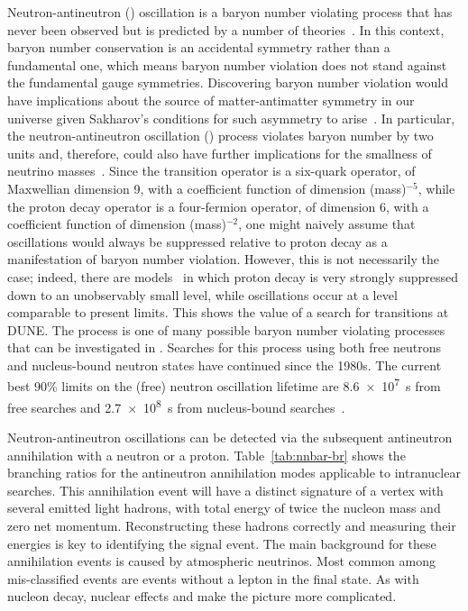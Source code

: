 Neutron-antineutron (\nnbar) oscillation is a baryon number violating process that
has never been observed but is predicted by a number of  theories~\cite{Phillips:2014fgb}. In this context, baryon number conservation is an accidental
symmetry rather than a fundamental one, which means baryon number violation
does not stand against the fundamental gauge symmetries. Discovering baryon
number violation would have implications about the source of matter-antimatter
symmetry in our universe given Sakharov's conditions for such asymmetry to arise~\cite{Sakharov:1967dj}.
In particular, the neutron-antineutron oscillation (\nnbar) process violates
baryon number by two units and, therefore, could also have further implications for
the smallness of neutrino masses~\cite{Phillips:2014fgb}. 
Since the \nnbar transition operator is a six-quark operator, of Maxwellian dimension \num{9}, with a coefficient function of dimension (mass)$^{-5}$, while the proton decay operator is a four-fermion operator, of dimension \num{6}, with a coefficient function of dimension (mass)$^{-2}$, one might naively assume that \nnbar oscillations would always be suppressed relative
to proton decay as a manifestation of baryon number violation.  However, this is not necessarily the case; indeed, there are models~\cite{Nussinov:2001rb} in which proton decay is very strongly suppressed down to an unobservably small level, while \nnbar oscillations occur at a level comparable to present limits. This shows the
value of a search for \nnbar transitions at DUNE.
The \nnbar process is one of many possible baryon number violating processes that can be investigated in . Searches for this process using
both free neutrons and nucleus-bound neutron states have continued 
since the 1980s. The current best \num{90}\%  limits on the (free) neutron oscillation lifetime are \SI{8.6e7}{\s} from free \nnbar searches and \SI{2.7e8}{\s} from nucleus-bound \nnbar searches~\cite{BaldoCeolin:1994jz,Abe:2011ky}.

Neutron-antineutron oscillations can be detected via the subsequent antineutron annihilation with a neutron or a proton. Table~\ref{tab:nnbar-br} shows the branching ratios for the antineutron annihilation modes applicable to intranuclear searches.  This annihilation event will have a distinct signature of a vertex with several emitted light hadrons, with total energy of twice the nucleon mass and zero net momentum. Reconstructing these hadrons correctly and measuring their energies is key to identifying the signal event. The main background for these \nnbar annihilation events is caused by atmospheric neutrinos. Most common among mis-classified events are   events without a lepton in the final state. As with nucleon decay, nuclear effects and  make the picture more complicated.


